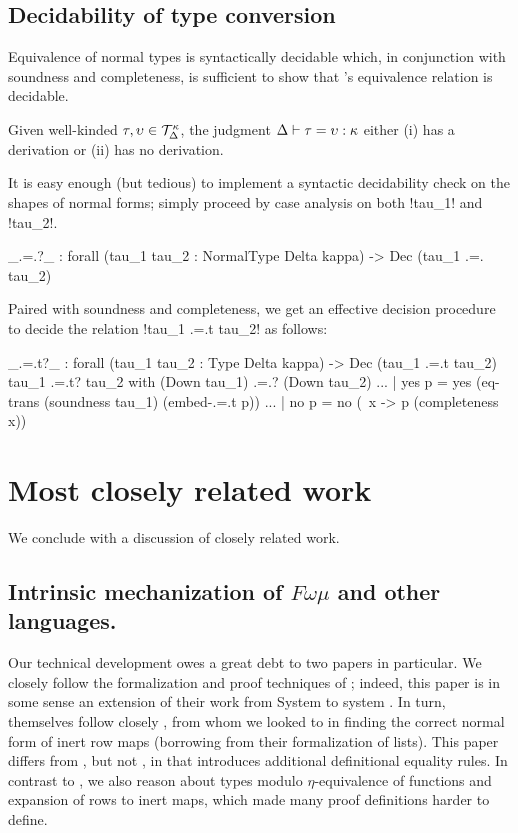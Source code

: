 \documentclass[sigplan,10pt,anonymous,review]{acmart}\settopmatter{printfolios=true,printccs=false,printacmref=false}
\begin{document}
\subsection{Decidability of type conversion}

Equivalence of normal types is syntactically decidable which, in conjunction with soundness and completeness, is sufficient to show that \Rome's equivalence relation is decidable.

\ifthms
\begin{theorem}[Decidability]
  Given well-kinded $\tau, \upsilon \in {\mathcal T}_{\Delta}^{\kappa}$, the judgment $\Delta \vdash \tau = \upsilon : \kappa$ either (i) has a derivation or (ii) has no derivation.
\end{theorem}\fi

It is easy enough (but tedious) to implement a syntactic decidability check on the shapes of normal forms; simply proceed by case analysis on both !tau_1! and !tau_2!.

\begin{agda}
_.=.?_ : forall (tau_1 tau_2 : NormalType Delta kappa) -> Dec (tau_1 .=. tau_2)
\end{agda}

Paired with soundness and completeness, we get an effective decision procedure to decide the relation !tau_1 .=.t tau_2! as follows: 

\begin{agda}
_.=.t?_ : forall (tau_1 tau_2 : Type Delta kappa) -> Dec (tau_1 .=.t tau_2)
tau_1 .=.t? tau_2  with (Down tau_1) .=.? (Down tau_2)
... | yes p = yes 
    (eq-trans 
        (soundness tau_1) 
        (embed-.=.t p))
... | no  p = no (\ x -> p (completeness x))
\end{agda}


\section{Most closely related work}
\label{sec:related-work} 

We conclude with a discussion of closely related work. 

\subsection{Intrinsic mechanization of $F\omega\mu$ and other languages.} Our technical development owes a great debt to two papers in particular. We closely follow the formalization and proof techniques of \citet{ChapmanKNW19}; indeed, this paper is in some sense an extension of their work from System \Fome to system \Rome. In turn, \citet{ChapmanKNW19} themselves follow closely \citet{AllaisBM13}, from whom we looked to in finding the correct normal form of inert row maps (borrowing from their formalization of lists). This paper differs from \citet{ChapmanKNW19}, but not \citet{AllaisBM13}, in that \Rome introduces additional definitional equality rules. In contrast to \citet{ChapmanKNW19}, we also reason about types modulo $\eta$-equivalence of functions and expansion of rows to inert maps, which made many proof definitions harder to define.
\end{document}

